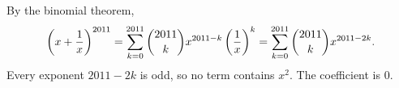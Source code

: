 By the binomial theorem,
\[
\left(x+\dfrac{1}{x}\right)^{2011}=\sum_{k=0}^{2011}\dbinom{2011}{k}x^{2011-k}\left(\dfrac{1}{x}\right)^{k}=\sum_{k=0}^{2011}\dbinom{2011}{k}x^{2011-2k}.
\]
Every exponent $2011-2k$ is odd, so no term contains $x^2$. The coefficient is $\boxed{0}$.
